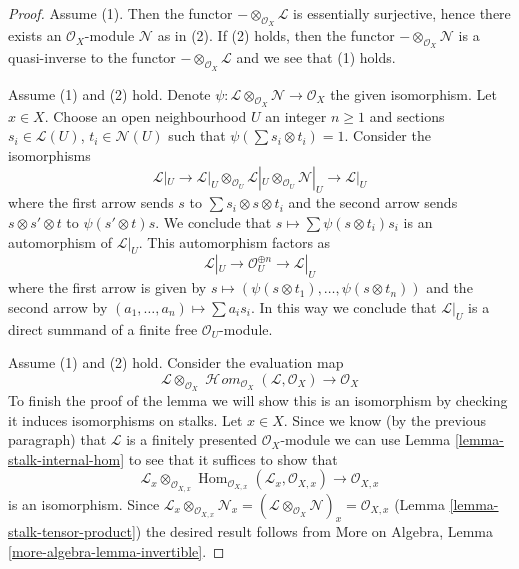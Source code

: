 \documentclass{stacks-project}
\theoremstyle{plain}
\theoremstyle{definition}
\theoremstyle{remark}
\numberwithin{equation}{subsection}
\def\Hom{\mathop{\mathrm{Hom}}\nolimits}
\def\SheafHom{\mathop{\mathcal{H}\!\mathit{om}}\nolimits}
\begin{document}
\begin{proof}
Assume (1). Then the functor $- \otimes_{\mathcal{O}_X} \mathcal{L}$
is essentially surjective, hence there exists an $\mathcal{O}_X$-module
$\mathcal{N}$ as in (2). If (2) holds, then the functor
$- \otimes_{\mathcal{O}_X} \mathcal{N}$ is a quasi-inverse
to the functor $- \otimes_{\mathcal{O}_X} \mathcal{L}$ and
we see that (1) holds.

\medskip\noindent
Assume (1) and (2) hold. Denote
$\psi : \mathcal{L} \otimes_{\mathcal{O}_X} \mathcal{N} \to \mathcal{O}_X$
the given isomorphism. Let $x \in X$. Choose an open neighbourhood
$U$ an integer $n \geq 1$ and sections $s_i \in \mathcal{L}(U)$,
$t_i \in \mathcal{N}(U)$ such that $\psi(\sum s_i \otimes t_i) = 1$.
Consider the isomorphisms
$$
\mathcal{L}|_U \to
\mathcal{L}|_U \otimes_{\mathcal{O}_U}
\mathcal{L}|_U \otimes_{\mathcal{O}_U} \mathcal{N}|_U \to \mathcal{L}|_U
$$
where the first arrow sends $s$ to $\sum s_i \otimes s \otimes t_i$
and the second arrow sends $s \otimes s' \otimes t$ to $\psi(s' \otimes t)s$.
We conclude that $s \mapsto \sum \psi(s \otimes t_i)s_i$ is
an automorphism of $\mathcal{L}|_U$. This automorphism factors as
$$
\mathcal{L}|_U \to \mathcal{O}_U^{\oplus n} \to \mathcal{L}|_U
$$
where the first arrow is given by
$s \mapsto (\psi(s \otimes t_1), \ldots, \psi(s \otimes t_n))$
and the second arrow by $(a_1, \ldots, a_n) \mapsto \sum a_i s_i$.
In this way we conclude that $\mathcal{L}|_U$ is a direct summand
of a finite free $\mathcal{O}_U$-module.

\medskip\noindent
Assume (1) and (2) hold. Consider the evaluation map
$$
\mathcal{L} \otimes_{\mathcal{O}_X}
\SheafHom_{\mathcal{O}_X}(\mathcal{L}, \mathcal{O}_X)
\longrightarrow \mathcal{O}_X
$$
To finish the proof of the lemma
we will show this is an isomorphism by checking it induces
isomorphisms on stalks. Let $x \in X$.
Since we know (by the previous paragraph)
that $\mathcal{L}$ is a finitely presented
$\mathcal{O}_X$-module
we can use Lemma \ref{lemma-stalk-internal-hom}
to see that it suffices to show that
$$
\mathcal{L}_x \otimes_{\mathcal{O}_{X, x}}
\Hom_{\mathcal{O}_{X, x}}(\mathcal{L}_x, \mathcal{O}_{X, x})
\longrightarrow \mathcal{O}_{X, x}
$$
is an isomorphism. Since
$\mathcal{L}_x \otimes_{\mathcal{O}_{X, x}} \mathcal{N}_x =
(\mathcal{L} \otimes_{\mathcal{O}_X} \mathcal{N})_x =
\mathcal{O}_{X, x}$ (Lemma \ref{lemma-stalk-tensor-product})
the desired result follows from
More on Algebra, Lemma \ref{more-algebra-lemma-invertible}.
\end{proof}
\end{document}
